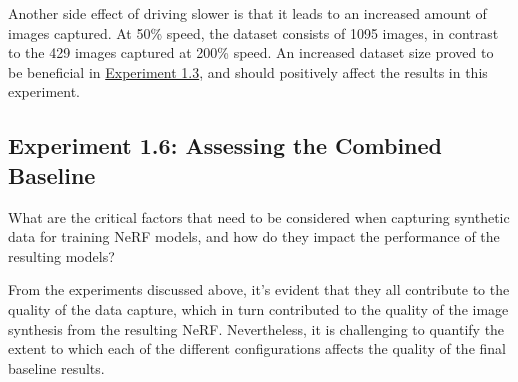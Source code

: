 Another side effect of driving slower is that it leads to an increased amount of images captured. At 50\% speed, the dataset consists of 1095 images, in contrast to the 429 images captured at 200\% speed. An increased dataset size proved to be beneficial in \hyperref[sec:exp-number-of-frames]{Experiment 1.3}, and should positively affect the results in this experiment.


























\subsection{Experiment 1.6: Assessing the Combined Baseline}
\begin{description}[leftmargin=!,labelwidth=\widthof{RQ 1:}]
\item[\textbf{RQ 1:}] What are the critical factors that need to be considered when capturing synthetic data for training NeRF models, and how do they impact the performance of the resulting models?
\end{description}


From the experiments discussed above, it's evident that they all contribute to the quality of the data capture, which in turn contributed to the quality of the image synthesis from the resulting NeRF. Nevertheless, it is challenging to quantify the extent to which each of the different configurations affects the quality of the final baseline results.


